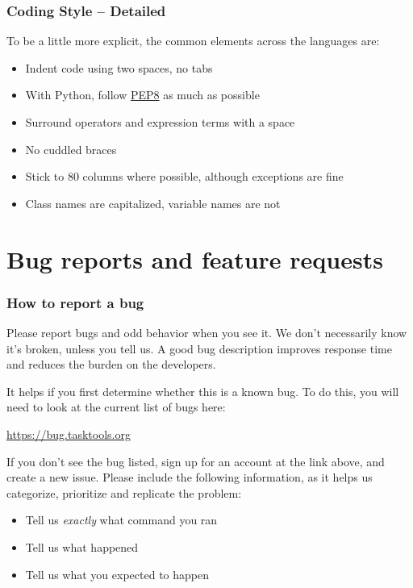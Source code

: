 \documentclass[t,handout]{beamer}
\begin{document}
\begin{frame}[fragile]\frametitle{Coding Style -- Detailed}
    \vfill
    To be a little more explicit, the common elements across the languages are:

    \begin{itemize}
        \item Indent code using two spaces, no tabs
        \item With Python, follow \href{https://www.python.org/dev/peps/pep-0008/}{PEP8} as much as possible
        \item Surround operators and expression terms with a space
        \item No cuddled braces
        \item Stick to 80 columns where possible, although exceptions are fine
        \item Class names are capitalized, variable names are not
    \end{itemize}
\end{frame}

\section{Bug reports and feature requests}

\begin{frame}[fragile]\frametitle{How to report a bug}
    Please report bugs and odd behavior when you see it. We don't necessarily know it's broken, unless you tell us. A good bug description improves response time and reduces the burden on the developers.

    It helps if you first determine whether this is a known bug.  To do this, you will need to look at the current list of bugs here:

    \href{https://bug.tasktools.org}{https://bug.tasktools.org}

    If you don't see the bug listed, sign up for an account at the link above, and create a new issue.  Please include the following information, as it helps us categorize, prioritize and replicate the problem:

    \begin{itemize}
        \item Tell us \textit{exactly} what command you ran
        \item Tell us what happened
        \item Tell us what you expected to happen
    \end{itemize}
\end{frame}
\end{document}
